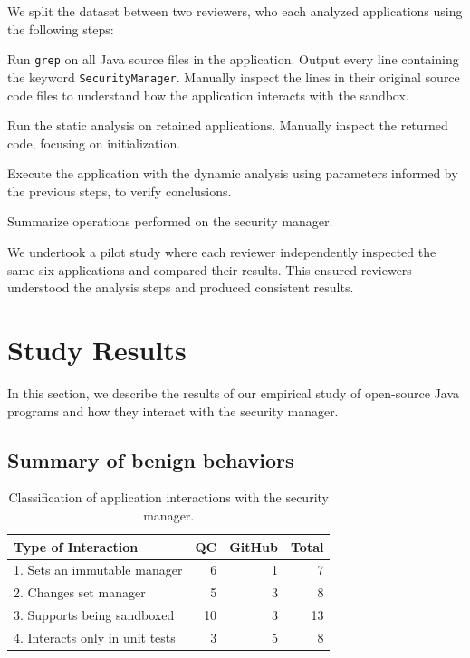 \documentclass{sig-alternate}
\begin{document}
We split the dataset between two reviewers, who each analyzed
applications using the following steps:

\begin{flushenum}\setlength{\parskip}{0pt}
  \setlength{\parsep}{0pt}
  \setlength{\itemsep}{0pt}
\item Run \texttt{grep} on all Java source files in the application.
Output every line containing the keyword \texttt{SecurityManager}.
Manually inspect the lines in their original source code files to understand
how the application interacts with the sandbox.
\item Run the static analysis on retained applications. Manually inspect the
  returned code, focusing on initialization. 
\item Execute the application with the dynamic analysis using parameters
  informed by the previous steps, 
to verify conclusions.
\item Summarize operations performed
on the security manager.
\end{flushenum}

We undertook a pilot study where each reviewer
independently inspected the same six applications and compared their
results. This ensured reviewers understood the analysis steps and produced
consistent results.


\section{Study Results}\label{sec:Study-results}

In this section, we describe the results of our empirical study of open-source
Java programs and how they interact with the security manager. 

\subsection{Summary of benign behaviors}\label{sub:Evaluation-of-the-hypotheses}


\begin{table}
\caption{Classification of application
  interactions \label{tab:Classification-of-Application}
with the security manager.}
\begin{tabular}{lrrr}
\toprule 
Type of Interaction & QC & GitHub & Total\tabularnewline
\midrule
1. Sets an immutable manager & 6 & 1 & 7\tabularnewline
2. Changes set manager & 5 & 3 & 8\tabularnewline
3. Supports being sandboxed & 10 & 3 & 13\tabularnewline
4. Interacts only in unit tests & 3 & 5 & 8\tabularnewline
\bottomrule
\end{tabular}
\end{table}
\end{document}
